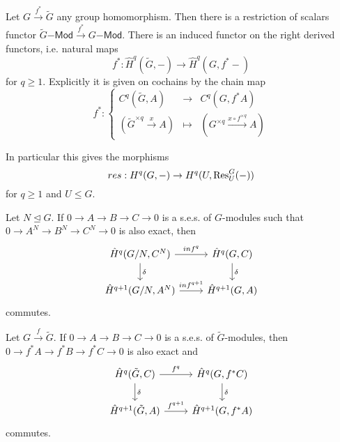 \documentclass[fontsize=11pt,fleqn,a4paper]{scrartcl}
\begin{document}
\begin{lemmadef}[Restriction]
Let $G\xrightarrow{f^\ast}\tilde{G}$ any group homomorphism. Then there is a restriction of scalars functor $ \tilde{G}\mathsf{-Mod} \xrightarrow{f^\ast} G\mathsf{-Mod}$. There is an induced functor on the right derived functors, i.e. natural maps
\[f^\ast: \hat{H}^q(\tilde{G},-) \to \hat{H}^q(G,f^\ast -)\]
for $q\geq 1$. Explicitly it is given on cochains by the chain map
\[f^\ast: \left\{\begin{array}{rcl}
C^q(\tilde{G},A) &\to& C^q(G,f^\ast A) \\
(\tilde{G}^{\times q} \xrightarrow{x} A) &\mapsto& (G^{\times q}\xrightarrow{x\circ f^{\times q}} A)
\end{array}\right.\]

In particular this gives the  morphisms
\[res: H^q(G,-) \to H^q(U,\operatorname{Res}_U^G(-))\]
for $q\geq 1$ and $U\leq G$.
\end{lemmadef}

\begin{proposition}
\end{proposition}

\begin{proposition}
Let $N\unlhd G$. If $0\to A\to B\to C\to 0$ is a s.e.s. of $G$-modules such that $0\to A^N\to B^N\to C^N\to 0$ is also exact, then
\[\begin{tikzcd}%
\hat{H}^q(G/N,C^N) \arrow[r,"inf^q"] \arrow[d,"\delta"] & \hat{H}^q(G,C) \arrow[d,"\delta"]\\
\hat{H}^{q+1}(G/N,A^N) \arrow[r,"inf^{q+1}"] & \hat{H}^{q+1}(G,A)
\end{tikzcd}\]
commutes.
\end{proposition}

\begin{proposition}
Let $G\xrightarrow{f}\tilde{G}$. If $0\to A\to B\to C\to 0$ is a s.e.s. of $\tilde{G}$-modules, then $0\to f^\ast A\to f^\ast B\to f^\ast C\to 0$ is also exact and
\[\begin{tikzcd}%
\hat{H}^q(\tilde{G},C) \arrow[r,"f^q"] \arrow[d,"\delta"] & \hat{H}^q(G,f^\ast C) \arrow[d,"\delta"]\\
\hat{H}^{q+1}(\tilde{G},A) \arrow[r,"f^{q+1}"] & \hat{H}^{q+1}(G,f^\ast A)
\end{tikzcd}\]
commutes.
\end{proposition}
\end{document}
